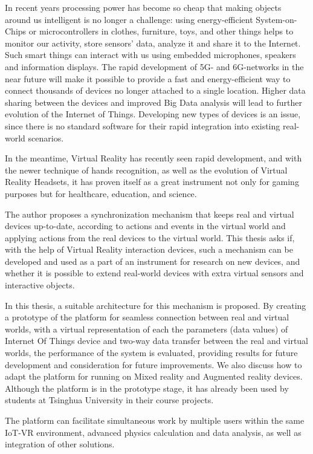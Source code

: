 \begin{abstract*}

  In recent years processing power has become so cheap that making objects around us intelligent is no longer a challenge: using energy-efficient System-on-Chips or microcontrollers in clothes, furniture, toys, and other things helps to monitor our activity, store sensors' data, analyze it and share it to the Internet. Such smart things can interact with us using embedded microphones, speakers and information displays. The rapid development of 5G- and 6G-networks in the near future will make it possible to provide a fast and energy-efficient way to connect thousands of devices no longer attached to a single location. Higher data sharing between the devices and improved Big Data analysis will lead to further evolution of the Internet of Things. Developing new types of devices is an issue, since there is no standard software for their rapid integration into existing real-world scenarios.
   
  In the meantime, Virtual Reality has recently seen rapid development, and with the newer technique of hands recognition, as well as the evolution of Virtual Reality Headsets, it has proven itself as a great instrument not only for gaming purposes but for healthcare, education, and science.
   
  The author proposes a synchronization mechanism that keeps real and virtual devices up-to-date, according to actions and events in the virtual world and applying actions from the real devices to the virtual world. This thesis asks if, with the help of Virtual Reality interaction devices, such a mechanism can be developed and used as a part of an instrument for research on new devices, and whether it is possible to extend real-world devices with extra virtual sensors and interactive objects.
  
  In this thesis, a suitable architecture for this mechanism is proposed. By creating a prototype of the platform for seamless connection between real and virtual worlds, with a virtual representation of each the parameters (data values) of Internet Of Things device and two-way data transfer between the real and virtual worlds, the performance of the system is evaluated, providing results for future development and consideration for future improvements. We also discuss how to adapt the platform for running on Mixed reality and Augmented reality devices. Although the platform is in the prototype stage, it has already been used by students at Tsinghua University in their course projects. 
  
  The platform can facilitate simultaneous work by multiple users within the same IoT-VR environment, advanced physics calculation and data analysis, as well as integration of other solutions.
  
\end{abstract*}
